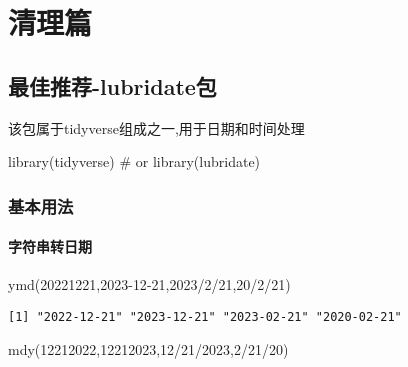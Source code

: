 \documentclass[
  letterpaper,
  DIV=11,
  numbers=noendperiod]{scrreprt}
\newenvironment{Shaded}{\begin{snugshade}}{\end{snugshade}}
\newcommand{\CommentTok}[1]{\textcolor[rgb]{0.37,0.37,0.37}{#1}}
\newcommand{\FunctionTok}[1]{\textcolor[rgb]{0.28,0.35,0.67}{#1}}
\newcommand{\NormalTok}[1]{\textcolor[rgb]{0.00,0.23,0.31}{#1}}
\newcommand{\StringTok}[1]{\textcolor[rgb]{0.13,0.47,0.30}{#1}}
\begin{document}
\part{清理篇}

\chapter{最佳推荐-lubridate包}\label{ux6700ux4f73ux63a8ux8350-lubridateux5305}

该包属于tidyverse组成之一,用于日期和时间处理

\begin{Shaded}
\begin{Highlighting}[]
\FunctionTok{library}\NormalTok{(tidyverse) }\CommentTok{\# or library(lubridate)}
\end{Highlighting}
\end{Shaded}

\section{基本用法}\label{ux57faux672cux7528ux6cd5}

\subsection{字符串转日期}\label{ux5b57ux7b26ux4e32ux8f6cux65e5ux671f}

\begin{Shaded}
\begin{Highlighting}[]
\FunctionTok{ymd}\NormalTok{(}\StringTok{\textquotesingle{}20221221\textquotesingle{}}\NormalTok{,}\StringTok{\textquotesingle{}2023{-}12{-}21\textquotesingle{}}\NormalTok{,}\StringTok{\textquotesingle{}2023/2/21\textquotesingle{}}\NormalTok{,}\StringTok{\textquotesingle{}20/2/21\textquotesingle{}}\NormalTok{)}
\end{Highlighting}
\end{Shaded}

\begin{verbatim}
[1] "2022-12-21" "2023-12-21" "2023-02-21" "2020-02-21"
\end{verbatim}

\begin{Shaded}
\begin{Highlighting}[]
\FunctionTok{mdy}\NormalTok{(}\StringTok{\textquotesingle{}12212022\textquotesingle{}}\NormalTok{,}\StringTok{\textquotesingle{}12212023\textquotesingle{}}\NormalTok{,}\StringTok{\textquotesingle{}12/21/2023\textquotesingle{}}\NormalTok{,}\StringTok{\textquotesingle{}2/21/20\textquotesingle{}}\NormalTok{)}
\end{Highlighting}
\end{Shaded}
\end{document}
